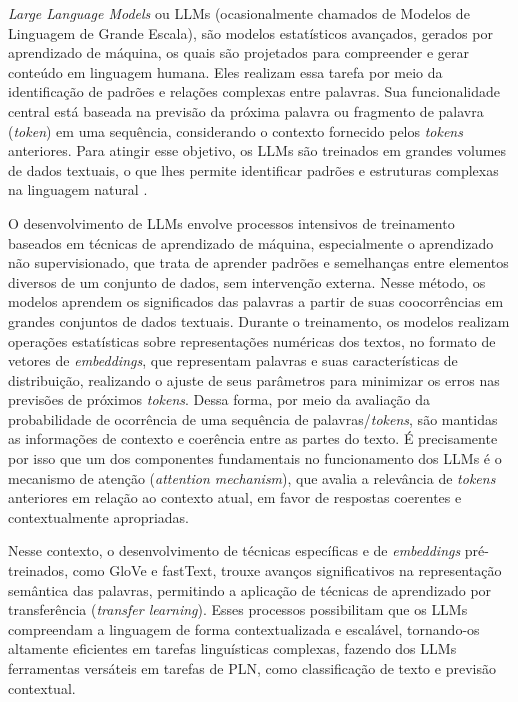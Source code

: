 \textit{Large Language Models} ou LLMs (ocasionalmente chamados de Modelos de Linguagem de Grande Escala), são modelos estatísticos avançados, gerados por aprendizado de máquina, os quais são projetados para compreender e gerar conteúdo em linguagem humana. Eles realizam essa tarefa por meio da identificação de padrões e relações complexas entre palavras. Sua funcionalidade central está baseada na previsão da próxima palavra ou fragmento de palavra (\textit{token}) em uma sequência, considerando o contexto fornecido pelos \textit{tokens} anteriores. Para atingir esse objetivo, os \ac{LLM}s são treinados em grandes volumes de dados textuais, o que lhes permite identificar padrões e estruturas complexas na linguagem natural \cite{LLMs:1, LLMs:2}.

O desenvolvimento de \ac{LLM}s envolve processos intensivos de treinamento baseados em técnicas de aprendizado de máquina, especialmente o aprendizado não supervisionado, que trata de aprender padrões e semelhanças entre elementos diversos de um conjunto de dados, sem intervenção externa. Nesse método, os modelos aprendem os significados das palavras a partir de suas coocorrências em grandes conjuntos de dados textuais. Durante o treinamento, os modelos realizam operações estatísticas sobre representações numéricas dos textos, no formato de vetores de \textit{embeddings}, que representam palavras e suas características de distribuição, realizando o ajuste de seus parâmetros para minimizar os erros nas previsões de próximos \textit{tokens}. Dessa forma, por meio da avaliação da probabilidade de ocorrência de uma sequência de palavras/\textit{tokens}, são mantidas as informações de contexto e coerência entre as partes do texto. É precisamente por isso que um dos componentes fundamentais no funcionamento dos \ac{LLM}s é o mecanismo de atenção (\textit{attention mechanism}), que avalia a relevância de \textit{tokens} anteriores em relação ao contexto atual, em favor de respostas coerentes e contextualmente apropriadas.

Nesse contexto, o desenvolvimento de técnicas específicas e de \textit{embeddings} pré-treinados, como GloVe e fastText, trouxe avanços significativos na representação semântica das palavras, permitindo a aplicação de técnicas de aprendizado por transferência (\textit{transfer learning}). Esses processos possibilitam que os \ac{LLM}s  compreendam a linguagem de forma contextualizada e escalável, tornando-os altamente eficientes em tarefas linguísticas complexas, fazendo dos \ac{LLM}s ferramentas versáteis em tarefas de \ac{PLN}, como classificação de texto e previsão contextual.

